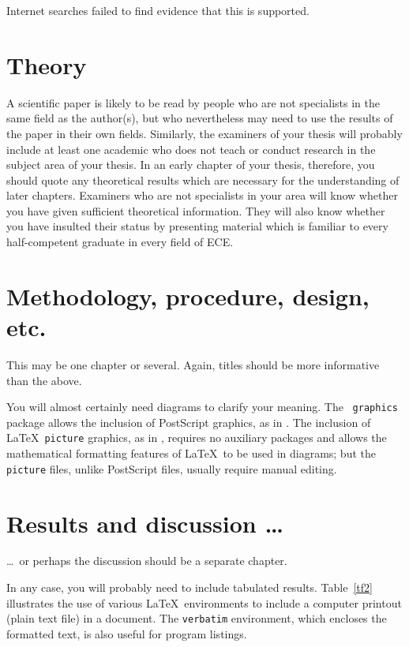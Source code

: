 \documentclass[12pt,openany,a4paper]{book}
\newcommand{\tab}[1]  {Table~\ref{#1}}		%
\begin{document}
\label{unproven} Internet searches failed to find evidence that this is supported.

\chapter{Theory}

A scientific paper is likely to be read by people who are not
specialists in the same field as the author(s), but who nevertheless
may need to use the results of the paper in their own fields.
Similarly, the examiners of your thesis will probably include at least
one academic who does not teach or conduct research in the subject
area of your thesis.  In an early chapter of your thesis, therefore,
you should quote any theoretical results which are necessary for the
understanding of later chapters.  Examiners who are not specialists in
your area will know whether you have given sufficient theoretical
information.  They will also know whether you have insulted their
status by presenting material which is familiar to every
half-competent graduate in every field of ECE.

\chapter{Methodology, procedure, design, etc.}

This may be one chapter or several.  Again, titles should be more
informative than the above.

You will almost certainly need diagrams to clarify your meaning.  The
\LaTeXe\ \texttt{graphics} package allows the inclusion of PostScript
graphics, as in .  The inclusion of \LaTeX\ \texttt{picture}
graphics, as in , requires no auxiliary packages and allows
the mathematical formatting features of \LaTeX\ to be used in
diagrams; but the \texttt{picture} files, unlike PostScript files,
usually require manual editing.


\chapter{Results and discussion \ldots}

\ldots\ or perhaps the discussion should be a separate chapter.

In any case, you will probably need to include tabulated results.
\tab{tf2} illustrates the use of various \LaTeX\ environments to
include a computer printout (plain text file) in a document.  The
\texttt{verbatim} environment, which encloses the formatted text, is
also useful for program listings.
\end{document}
